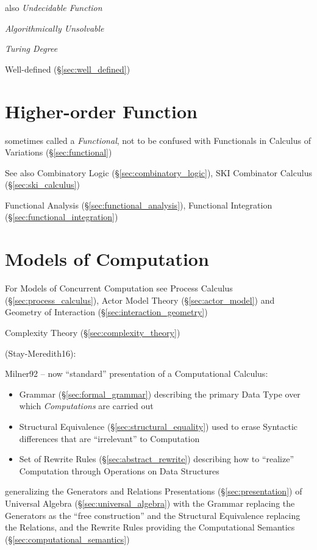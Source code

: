 also \emph{Undecidable Function}

\emph{Algorithmically Unsolvable}

\emph{Turing Degree}

Well-defined (\S\ref{sec:well_defined})



\section{Higher-order Function}\label{sec:higherorder_function}

sometimes called a \emph{Functional}, not to be confused with Functionals in
Calculus of Variations (\S\ref{sec:functional})

\fist See also Combinatory Logic (\S\ref{sec:combinatory_logic}), SKI
Combinator Calculus (\S\ref{sec:ski_calculus})

\fist Functional Analysis (\S\ref{sec:functional_analysis}), Functional
Integration (\S\ref{sec:functional_integration})



\section{Models of Computation}\label{sec:computation_model}

\fist For Models of Concurrent Computation see Process Calculus
(\S\ref{sec:process_calculus}), Actor Model Theory
(\S\ref{sec:actor_model}) and Geometry of Interaction
(\S\ref{sec:interaction_geometry})

\fist Complexity Theory (\S\ref{sec:complexity_theory})

\asterism

(Stay-Meredith16):

Milner92 \cite{milner92} -- now ``standard'' presentation of a Computational
Calculus:
\begin{itemize}
  \item Grammar (\S\ref{sec:formal_grammar}) describing the primary Data Type
    over which \emph{Computations} are carried out
  \item Structural Equivalence (\S\ref{sec:structural_equality}) used to erase
    Syntactic differences that are ``irrelevant'' to Computation
  \item Set of Rewrite Rules (\S\ref{sec:abstract_rewrite}) describing how to
    ``realize'' Computation through Operations on Data Structures
\end{itemize}
generalizing the Generators and Relations Presentations
(\S\ref{sec:presentation}) of Universal Algebra (\S\ref{sec:universal_algebra})
with the Grammar replacing the Generators as the ``free construction'' and the
Structural Equivalence replacing the Relations, and the Rewrite Rules providing
the Computational Semantics (\S\ref{sec:computational_semantics})

